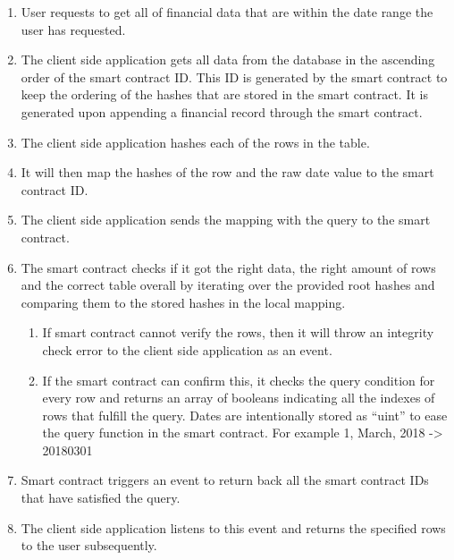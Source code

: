 \begin{enumerate}
\item User requests to get all of financial data that are within the date range the user has requested.
\item The client side application gets all data from the database in the ascending order of the smart contract ID. This ID is generated by the smart contract to keep the ordering of the hashes that are stored in the smart contract. It is generated upon appending a financial record through the smart contract.
\item The client side application hashes each of the rows in the table.
\item It will then map the hashes of the row and the raw date value to the smart contract ID.
\item The client side application sends the mapping with the query to the smart contract.
\item The smart contract checks if it got the right data, the right amount of rows and the correct table overall by iterating over the provided root hashes and comparing them to the stored hashes in the local mapping.
	\begin{enumerate}
	\item If smart contract cannot verify the rows, then it will throw an integrity check error to the client side application as an event.
	\item If the smart contract can confirm this, it checks the query condition for every row and returns an array of booleans indicating all the indexes of rows that fulfill the query. Dates are intentionally stored as “uint” to ease the query function in the smart contract. For example 1, March, 2018 -> 20180301
	\end{enumerate}
\item Smart contract triggers an event to return back all the smart contract IDs that have satisfied the query.
\item The client side application listens to this event and returns the specified rows to the user subsequently.
\end{enumerate}
